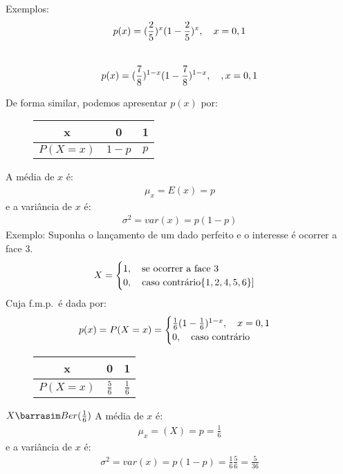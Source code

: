 \documentclass[11pt,a4paper]{book}
\begin{document}
\begin{enumerate}[label=(\alph*)]
\begin{enumerate}
Exemplos: 
$$p(x)=(\frac{2}{5})^x(1-\frac{2}{5})^x, \text{\quad}x=0,1$$\\
$$p(x)=(\frac{7}{8})^{1-x}(1-\frac{7}{8})^{1-x}, \text{\quad }, x=0,1$$

De forma similar, podemos apresentar $p(x)$ por:
\begin{figure} 
  \centering
  \begin{tabular}{c c c}
    \toprule
    x&0&1\\ \midrule
    $P(X=x)$&$1-p$&$p$\\ \bottomrule
  \end{tabular}
  \label{fig:7}
\end{figure}
A média de $x$ é: 
\begin{align}
  \mu_{x}=E(x)=p
\end{align}
e a variância de $x$ é: 
\begin{align}
  \sigma^2 = var(x)=p (1-p)
\end{align}
Exemplo: Suponha o lançamento de um dado perfeito e o interesse é ocorrer a face
3.
\begin{align*}
  X=\begin{cases}
    1, \text{\quad se ocorrer a face }3\\
    0, \text{\quad caso contrário}\{1,2,4,5,6\}]
  \end{cases}
\end{align*}
Cuja f.m.p.\ é dada por:
\begin{align}
  p(x)=P(X=x)=\begin{cases}
    \frac{1}{6}(1-\frac{1}{6})^{1-x}, \text{\quad}x=0,1\\
    0, \text{\quad caso contrário}
  \end{cases}
\end{align}
\begin{figure} 
  \centering
  \begin{tabular}{c c c}
    \toprule
    x&0&1\\ \midrule
    $P(X=x)$&$\frac{5}{6}$&$\frac{1}{6}$\\ \bottomrule
  \end{tabular}
  \label{fig:8}
\end{figure}
$X \barrasim Ber(\frac{1}{6})$
A média de $x$ é: 
\begin{align*}
  \mu_{x}=(X)=p=\frac{1}{6}
\end{align*}
e a variância de $x$ é: 
\begin{align*}
  \sigma^2= var(x)=p(1-p)=\frac{1}{6}\frac{5}{6}=\frac{5}{36}
\end{align*}

\end{enumerate}
\end{enumerate}
\end{document}
